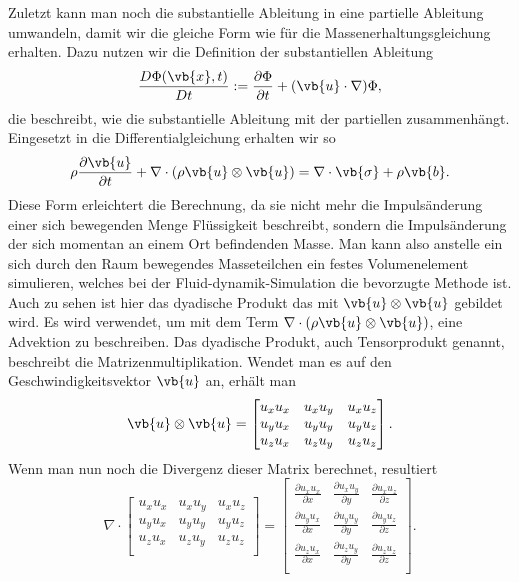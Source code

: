 Zuletzt kann man noch die substantielle Ableitung in eine partielle Ableitung umwandeln, damit wir die gleiche Form wie für die Massenerhaltungsgleichung erhalten.
Dazu nutzen wir die Definition der substantiellen Ableitung
\[
\frac{D\Phi(\vb{x},t)}{Dt}
:=
\frac{\partial \Phi}{\partial t}+(\vb{u}\cdot \nabla)\Phi
,\] 
die beschreibt, wie die substantielle Ableitung mit der partiellen zusammenhängt.
Eingesetzt in die Differentialgleichung erhalten wir so 
\begin{equation}
\label{openfoam:euler2}
\rho\frac{\partial\vb{u}}{\partial t} + \nabla \cdot(\rho\vb{u}\otimes \vb{u})
= 
\nabla \cdot \vb{\sigma} +\rho \vb{b}.
\end{equation}
Diese Form erleichtert die Berechnung, da sie nicht mehr die Impulsänderung einer sich bewegenden Menge Flüssigkeit beschreibt, sondern die Impulsänderung der sich momentan an einem Ort befindenden Masse. 
Man kann also anstelle ein sich durch den Raum bewegendes Masseteilchen ein festes Volumenelement simulieren, welches bei der Fluid-dynamik-Simulation die bevorzugte Methode ist.
Auch zu sehen ist hier das dyadische Produkt das mit $\vb{u}\otimes \vb{u}$ gebildet wird.
Es wird verwendet, um mit dem Term $\nabla \cdot(\rho\vb{u}\otimes \vb{u})$, eine Advektion zu beschreiben.
Das dyadische Produkt, auch Tensorprodukt genannt, beschreibt die Matrizenmultiplikation.
Wendet man es auf den Geschwindigkeitsvektor $\vb{u}$ an, erhält man
\begin{equation}
\vb{u}\otimes \vb{u}
= 
\begin{bmatrix}
	u_x u_x &  u_x u_y & u_x u_z \\
	u_y u_x &  u_y u_y & u_y u_z \\
	u_z u_x &  u_z u_y & u_z u_z \\
\end{bmatrix}
.
\end{equation}
Wenn man nun noch die Divergenz dieser Matrix berechnet, resultiert
\begin{equation}
\nabla \cdot 
\begin{bmatrix}
	u_x u_x &  u_x u_y & u_x u_z \\
	u_y u_x &  u_y u_y & u_y u_z \\
	u_z u_x &  u_z u_y & u_z u_z \\
\end{bmatrix}
= 
\begin{bmatrix}
	\frac{\partial u_x u_x}{\partial x} &  \frac{\partial u_x u_y}{\partial y} & \frac{\partial u_x u_z}{\partial z} \\
	\frac{\partial u_y u_x}{\partial x} &  \frac{\partial u_y u_y}{\partial y} & \frac{\partial u_y u_z}{\partial z} \\
	\frac{\partial u_z u_x}{\partial x} &  \frac{\partial u_z u_y}{\partial y} & \frac{\partial u_z u_z}{\partial z}  \\
\end{bmatrix}
.
\end{equation}
